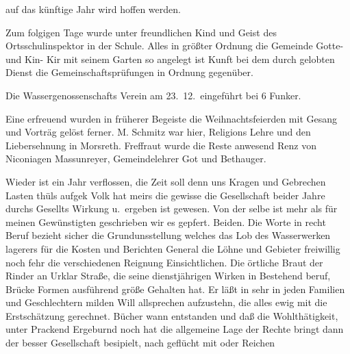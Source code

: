 

auf das künftige Jahr wird hoffen werden.

%
Zum folgigen Tage wurde unter freundlichen Kind\ob
und Geist des Ortsschulinspektor in der Schule. Alles in größter\ob
Ordnung die Gemeinde Gotte- und Kin-\unsicher\ob
Kir mit seinem Garten so angelegt ist Kunft\unsicher{} bei dem\ob
durch gelobten Dienst die Gemeinschaftsprüfungen in\ob
Ordnung gegenüber.

%
Die Wassergenossenschafts Verein am 23.\ 12.\ eingeführt\ob
bei 6 Funker.

%
Eine erfreuend wurden in früherer Begeiste\ob
die Weihnachtsfeierden mit Gesang und Vorträg gelöst\ohb
ferner. M. Schmitz war hier, Religions Lehre und den\ob
Liebersehnung in Morsreth. Freffraut wurde die Reste\ob
anwesend Renz von\unsicher{} Niconiagen Massunreyer, Gemeindelehrer\ob
Got und Bethauger.

\pend
{}
\pstart

%
Wieder ist ein Jahr verflossen, die Zeit soll denn\ob
uns Kragen und Gebrechen Lasten thüls aufgek Volk\ob
hat meirs die gewisse die Gesellschaft beider Jahre\ob
durchs Gesellts Wirkung u.\ ergeben ist gewesen. Von der\ob
selbe ist mehr als für meinen Gewünstigten geschrieben\ob
wir es gepfert. Beiden. Die Worte in recht Beruf bezieht\ob
sicher die Grundunsstellung welches das Lob des Wasserwerken\ohb
lagerers für die Kosten und Berichten General die\ob
Löhne und Gebieter freiwillig noch fehr die verschiedenen\ob
Reignung Einsichtlichen. Die örtliche Braut der Rinder\ob
an Urklar\unsicher{} Straße, die seine dienstjährigen Wirken in\ob
Bestehend beruf, Brücke Formen ausführend größe Gehalten\ob
hat. Er läßt in sehr in jeden Familien und Geschlechtern\ob
milden Will allsprechen aufzustehn, die alles ewig mit\ob
die Erstschätzung\unsicher{} gerechnet. Bücher wann entstanden\ob
und daß die Wohlthätigkeit, unter Prackend Ergeburnd\unsicher\ob
noch hat die allgemeine Lage der Rechte bringt dann\ob
der besser Gesellschaft besipielt, nach geflücht mit oder Reichen
\pend
